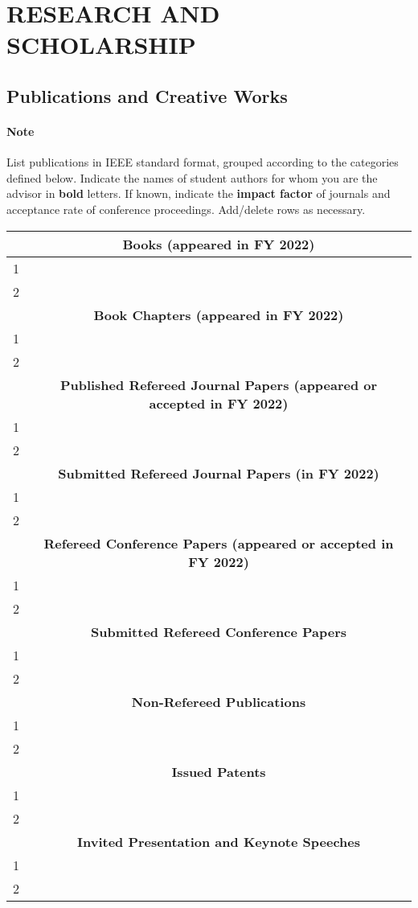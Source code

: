\documentclass[11pt]{article}
\newcommand{\fy}{2022}
\begin{document}
\newpage
\section{RESEARCH AND SCHOLARSHIP}

\subsection{Publications and Creative Works}

\paragraph{Note} List publications in IEEE standard format, grouped according to the categories defined below. Indicate the names of student authors for whom
you are the advisor in \textbf{bold} letters. If known, indicate the
\textbf{impact factor} of journals and acceptance rate of conference
proceedings. Add/delete rows as necessary.


\begin{center}
  \begin{tabular}{cc}
    \toprule
    &\textbf{Books (appeared in FY \fy{})}\\
    \midrule
    1& \\
    2& \\
    \toprule
    &\textbf{Book Chapters (appeared in FY \fy{})}\\
    \midrule
    1& \\
    2& \\
    \toprule
    &\textbf{Published Refereed Journal Papers (appeared or accepted in FY \fy{})}\\
    \midrule
    1& \\
    2& \\
    \toprule
    &\textbf{Submitted Refereed Journal Papers (in FY \fy{})}\\
    \midrule
    1& \\
    2& \\
    \toprule
    &\textbf{Refereed Conference Papers (appeared or accepted in FY \fy{})}\\
    \midrule
    1& \\
    2& \\
    \toprule
    &\textbf{Submitted Refereed Conference Papers}\\
    \midrule
    1& \\
    2& \\
    \toprule
    &\textbf{Non-Refereed Publications}\\
    \midrule
    1& \\
    2& \\
    \toprule
    &\textbf{Issued Patents}\\
    \midrule
    1& \\
    2& \\
    \toprule
    &\textbf{Invited Presentation and Keynote Speeches}\\
    \midrule
    1& \\
    2& \\    
    \bottomrule
  \end{tabular}
\end{center}
\end{document}
